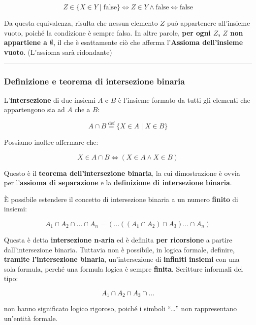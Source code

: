 \documentclass[
  a4paper,
]{article}
\begin{document}
\[
Z \in \{ X \in Y \mid \text{false} \} \iff Z \in Y \land \text{false} \iff \text{false}
\]

Da questa equivalenza, risulta che nessun elemento \(Z\) può appartenere
all'insieme vuoto, poiché la condizione è sempre falsa. In altre parole,
\textbf{per ogni \(Z\), \(Z\) non appartiene a \(\emptyset\)}, il che è
esattamente ciò che afferma l'\textbf{Assioma dell'insieme vuoto}.
(L'assioma sarà ridondante)

\par\noindent\rule{\linewidth}{0.4pt}\par\vspace{6pt}

\hypertarget{definizione-e-teorema-di-intersezione-binaria}{%
\subsubsection{Definizione e teorema di intersezione
binaria}\label{definizione-e-teorema-di-intersezione-binaria}}

L'\textbf{intersezione} di due insiemi \(A\) e \(B\) è l'insieme formato
da tutti gli elementi che appartengono sia ad \(A\) che a \(B\):

\[
A \cap B \overset{\mathrm{def}}{=} \{ X \in A \mid X \in B \}
\]

Possiamo inoltre affermare che:

\[
X \in A \cap B \iff (X \in A \land X \in B)
\]

Questo è il \textbf{teorema dell'intersezione binaria}, la cui
dimostrazione è ovvia per l'\textbf{assioma di separazione} e la
\textbf{definizione di intersezione binaria}.

È possibile estendere il concetto di intersezione binaria a un numero
\textbf{finito} di insiemi:

\[
A_1 \cap A_2 \cap \dots \cap A_n = (\dots((A_1 \cap A_2) \cap A_3)\dots \cap A_n)
\]

Questa è detta \textbf{intersezione n-aria} ed è definita \textbf{per
ricorsione} a partire dall'intersezione binaria. Tuttavia non è
possibile, in logica formale, definire, \textbf{tramite l'intersezione
binaria}, un'intersezione di \textbf{infiniti insiemi} con una sola
formula, perché una formula logica è sempre \textbf{finita}. Scritture
informali del tipo:

\[
A_1 \cap A_2 \cap A_3 \cap \dots
\]

non hanno significato logico rigoroso, poiché i simboli ``\ldots{}'' non
rappresentano un'entità formale.
\end{document}
